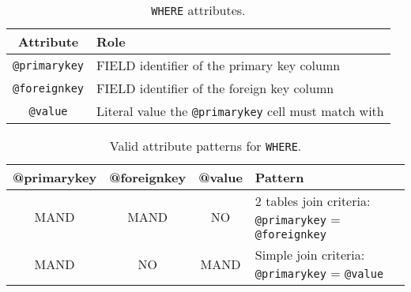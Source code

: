 \begin{table}[!htbp]
\small
\centering
\begin{tabulary}{\linewidth}{|c|J|}       
       \hline 
            \textbf{Attribute} & 
            \textbf {Role}\\
       \hline         \hline  
            \texttt{@primarykey} &
            FIELD identifier of the primary key column \\
        \hline 
            \texttt{@foreignkey} & 
            FIELD identifier of the foreign key column \\
        \hline 
            \texttt{@value} & 
            Literal value the  \texttt{@primarykey} cell must match with\\
        \hline 
     \end{tabulary}
     \caption{\texttt{WHERE} attributes.} 
     \label{tbl:where-att}
 \end{table}

\begin{table}[!htbp]
\small
\centering
\begin{tabulary}{\linewidth}{|c|c|c|J|}
    \hline 
        \textbf{@primarykey} &
        \textbf{@foreignkey} &
        \textbf{@value} &
        \textbf{Pattern}\\
    \hline      \hline  
        MAND &           
        MAND &           
        NO &           
        2 tables join criteria: \texttt{@primarykey} = \texttt{@foreignkey} \\
    \hline     
        MAND &           
        NO &           
        MAND &           
        Simple join criteria: \texttt{@primarykey} = \texttt{@value} \\
   \hline 
\end{tabulary}
     \caption{Valid attribute patterns for  \texttt{WHERE}.}
     \label{tbl:where-pattern}
\end{table}
